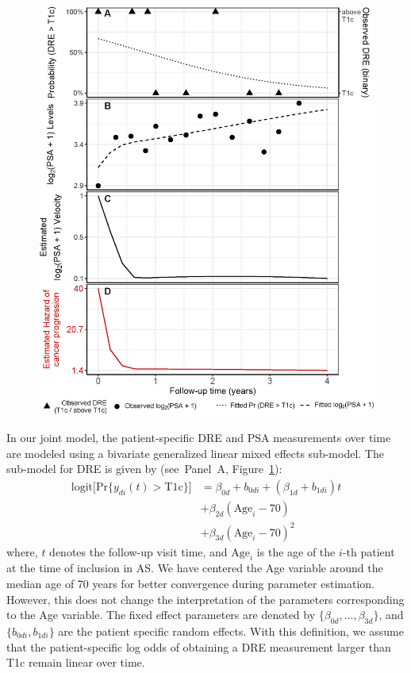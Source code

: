 \documentclass[Afour,sagev,times]{sagej}
\begin{document}
\begin{figure}[!htb]
\captionsetup{justification=justified}
\centerline{\includegraphics[width=\columnwidth]{Figure3.eps}}

\label{Figure3}
\end{figure}

In our joint model, the patient-specific DRE and PSA measurements over time are modeled using a bivariate generalized linear mixed effects sub-model. The sub-model for DRE is given by (see~Panel~A, Figure~\ref{Figure3}):
\begin{equation}
\label{eq:long_model_dre}
\begin{split}
    \mbox{logit} \big[\mbox{Pr}\{y_{di}(t) > \mbox{T1c}\}\big] &= \beta_{0d} + b_{0di} + (\beta_{1d} + b_{1di}) t\\
    &+ \beta_{2d} (\mbox{Age}_i-70)\\ & + \beta_{3d} (\mbox{Age}_i-70)^2
    \end{split}
\end{equation}
where, $t$ denotes the follow-up visit time, and $\mbox{Age}_i$ is the age of the ${i\mbox{-th}}$ patient at the time of inclusion in AS. We have centered the Age variable around the median age of 70 years for better convergence during parameter estimation. However, this does not change the interpretation of the parameters corresponding to the Age variable. The fixed effect parameters are denoted by ${\{\beta_{0d}, \ldots, \beta_{3d}\}}$, and ${\{b_{0di}, b_{1di}\}}$ are the patient specific random effects. With this definition, we assume that the patient-specific log odds of obtaining a DRE measurement larger than T1c remain linear over time. 
\end{document}
